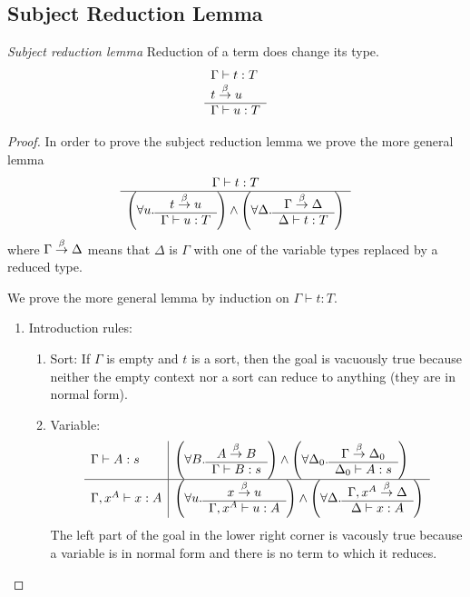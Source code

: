 \subsection{Subject Reduction Lemma}

\begin{theorem}
    \label{SubjectReduction}
    \emph{Subject reduction lemma} Reduction of a term does change its type.
    $$
    \begin{array}{l} 
        \Gamma \vdash t: T
        \\
        t \stackrel{\beta}{\to} u
     \\ \hline 
        \Gamma \vdash u: T
    \end{array}
    $$

    {
    \def\SRLeftPart#1#2#3#4{
        \left(
        \forall #1.
        \ruleh{#2 \reduce #1}{#3 \vdash #1: #4}
        \right)
    }
    \def\SRRightPart#1#2#3#4{
        \left(
        \forall #1.
        \ruleh{#2 \reduce #1}{#1 \vdash #3: #4}
        \right)
    }

    \begin{proof} In order to prove the subject reduction lemma we prove the
        more general lemma
        $$
        \ruleh{
            \Gamma \vdash t: T
        }
        {
            \SRLeftPart u t \Gamma T
            \land
            \SRRightPart \Delta \Gamma t T
        }
        $$
        where $\Gamma \stackrel{\beta}{\to} \Delta$ means that $\Delta$ is $\Gamma$ with one
        of the variable types replaced by a reduced type.

        We prove the more general lemma by induction on $\Gamma \vdash t: T$.
        \begin{enumerate}
            \item Introduction rules:
            \begin{enumerate}
                \item Sort: If $\Gamma$ is empty and $t$ is a sort, then the
                    goal is vacuously true because neither the empty context nor
                    a sort can reduce to anything (they are in normal form).

                \item Variable:
                    $$
                    \begin{array}{l|l}
                        \Gamma \vdash A : s
                        &
                        \SRLeftPart B A \Gamma s
                        \land
                        \SRRightPart {\Delta_0} \Gamma A s
                        \\
                        \hline
                        \Gamma, x^A \vdash x: A
                        &
                        \SRLeftPart u x {\Gamma,x^A} A
                        \land
                        \SRRightPart \Delta {\Gamma,x^A} x A
                    \end{array}
                    $$
                    The left part of the goal in the lower right corner is
                    vacously true because a variable is in normal form and there
                    is no term to which it reduces.


\end{enumerate}
\end{enumerate}
\end{proof}}
\end{theorem}
